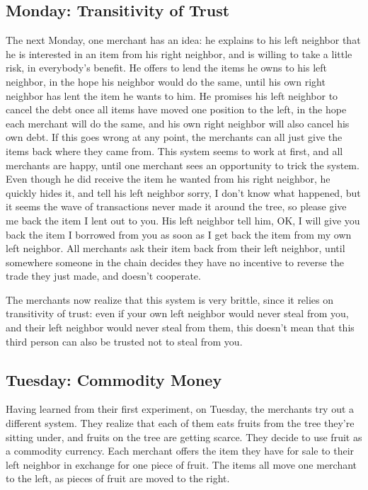 \documentclass[11pt,twoside,a4paper]{article}
\begin{document}
\subsection{Monday: Transitivity of Trust}
The next Monday, one merchant has an idea: he explains to his left neighbor that he is interested in an item from his right neighbor, and is willing to take a little risk, in everybody's benefit. He offers to lend the items he owns to his left neighbor, in the hope his neighbor would do the same, until his own right neighbor has lent the item he wants to him.
He promises his left neighbor to cancel the debt once all items have moved one position to the left, in the hope each merchant will do the same, and his own right neighbor will also cancel his own debt.
If this goes wrong at any point, the merchants can all just give the items back where they came from. This system seems to work at first, and all merchants are happy, until one merchant sees an opportunity to trick the system. Even though he did receive the item he wanted from his right neighbor, he quickly hides it, and tell his left neighbor sorry, I don't know what happened, but it seems the wave of transactions never made it around the tree, so please give me back the item I lent out to you. His left neighbor tell him, OK, I will give you back the item I borrowed from you as soon as I get back the item from my own left neighbor. All merchants ask their item back from their left neighbor, until somewhere someone in the chain decides they have no incentive to reverse the trade they just made, and doesn't cooperate.

The merchants now realize that this system is very brittle, since it relies on transitivity of trust: even if your own left neighbor would never steal from you, and their left neighbor would never steal from them, this doesn't mean that this third person can also be trusted not to steal from you.

\subsection{Tuesday: Commodity Money}
Having learned from their first experiment, on Tuesday, the merchants try out a different system. They realize that each of them eats fruits from the tree they're sitting under, and fruits on the tree are getting scarce. They decide to use fruit as a commodity currency. Each merchant offers the item they have for sale to their left neighbor in exchange for one piece of fruit. The items all move one merchant to the left, as pieces of fruit are moved to the right.
\end{document}
